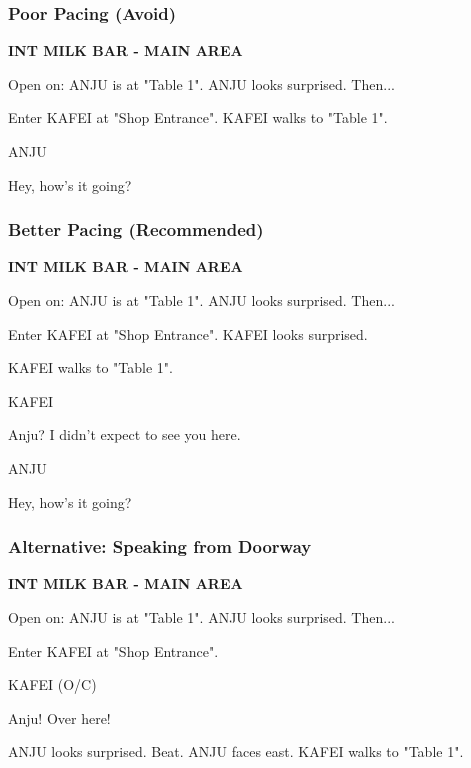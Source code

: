 \documentclass[11pt,letterpaper,oldstylefigures]{memoir}
\newcommand{\slugline}[1]{\nobreak\textbf{\MakeUppercase{#1}}\par\nobreak\vspace{1\baselineskip}}
\newcommand{\speaker}[1]{\nobreak\hspace*{0.333\textwidth}\MakeUppercase{#1}\par\nobreak\vspace{0.5\baselineskip}}
\newcommand{\dialogue}[1]{\nobreak\hspace*{0.25\textwidth}\begin{minipage}{0.5\textwidth}#1\end{minipage}\par\vspace{1\baselineskip}}
\newcommand{\stagedir}[1]{#1\par\vspace{1\baselineskip}}
\newenvironment{FountainExample}
  {\begingroup
  \ttfamily\small
   \setlength{\parindent}{0pt}
  \setlength{\parskip}{0.5em}
  \allowdisplaybreaks
  \setlength{\displaywidowpenalty}{0}
  \setlength{\widowpenalty}{0}
  \setlength{\clubpenalty}{0}
  \setlength{\interlinepenalty}{0}
}
  {\endgroup}
\begin{document}
\subsubsection{Poor Pacing (Avoid)}
\begin{FountainExample}
\slugline{INT MILK BAR - MAIN AREA}

\stagedir{Open on: ANJU is at "Table 1". ANJU looks surprised. Then...}
\stagedir{Enter KAFEI at "Shop Entrance". KAFEI walks to "Table 1".}

\speaker{ANJU}
\dialogue{Hey, how's it going?}
\end{FountainExample}

\subsubsection{Better Pacing (Recommended)}
\begin{FountainExample}
\slugline{INT MILK BAR - MAIN AREA}

\stagedir{Open on: ANJU is at "Table 1". ANJU looks surprised. Then...}
\stagedir{Enter KAFEI at "Shop Entrance". KAFEI looks surprised.}
\stagedir{KAFEI walks to "Table 1".}

\speaker{KAFEI}
\dialogue{Anju? I didn't expect to see you here.}

\speaker{ANJU}
\dialogue{Hey, how's it going?}
\end{FountainExample}

\subsubsection{Alternative: Speaking from Doorway}
\begin{FountainExample}
\slugline{INT MILK BAR - MAIN AREA}

\stagedir{Open on: ANJU is at "Table 1". ANJU looks surprised. Then...}
\stagedir{Enter KAFEI at "Shop Entrance".}

\speaker{KAFEI (O/C)}
\dialogue{Anju! Over here!}

\stagedir{ANJU looks surprised. Beat. ANJU faces east. KAFEI walks to "Table 1".}
\end{FountainExample}
\end{document}
